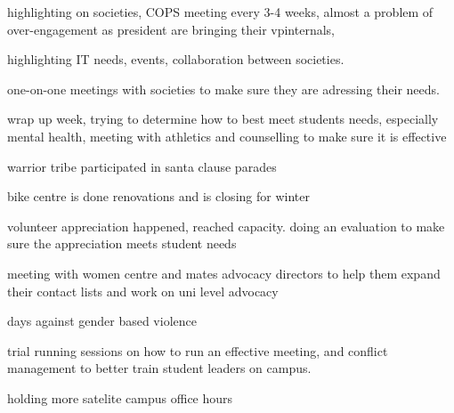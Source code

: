 \begin{information}
    highlighting on societies, COPS meeting every 3-4 weeks, almost a problem
    of over-engagement as president are bringing their vpinternals, 

    highlighting IT needs, events, collaboration between societies. 

    one-on-one meetings with societies to make sure they are adressing their 
    needs.

    wrap up week, trying to determine how to best meet students needs, especially
    mental health, meeting with athletics and counselling to make sure it is
    effective

    warrior tribe participated in santa clause parades

    bike centre is done renovations and is closing for winter

    volunteer appreciation happened, reached capacity. doing an evaluation to
    make sure the appreciation meets student needs

    meeting with women centre and mates advocacy directors to help them
    expand their contact lists and work on uni level advocacy

    days against gender based violence

    trial running sessions on how to run an effective meeting, and conflict management to
    better train student leaders on campus. 

    holding more satelite campus office hours
    
\end{information}

